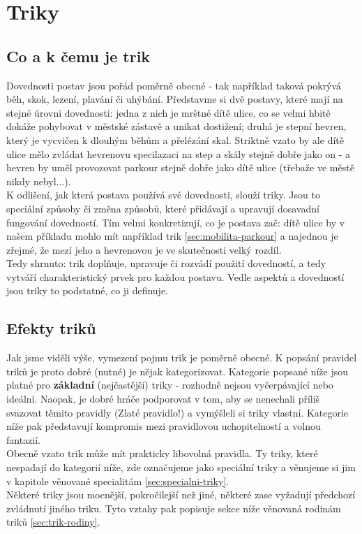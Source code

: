 \documentclass[../main.tex]{subfiles}
\begin{document}
\chapter{Triky}
\label{chap:triky}

\section{Co a k čemu je trik}
\label{sec:coakcemu-trik}
Dovednosti postav jsou pořád poměrně obecné - tak například taková  pokrývá běh, skok, lezení, plavání či uhýbání. Představme si dvě postavy, které mají  na stejné úrovni dovednosti: jedna z nich je mrštné dítě ulice, co se velmi hbitě dokáže pohybovat v městské zástavě a unikat dostižení; druhá je stepní hevren, který je vycvičen k dlouhým běhům a přelézání skal. Striktně vzato by ale dítě ulice mělo zvládat hevrenovu specilazaci na step a skály stejně dobře jako on - a hevren by uměl provozovat parkour stejně dobře jako dítě ulice (třebaže ve městě nikdy nebyl...).\\
K odlišení, jak která postava používá své dovednosti, slouží triky. Jsou to speciální způsoby či změna způsobů, které přidávají a upravují dosavadní fungování dovedností. Tím velmi konkretizují, co je postava zač: dítě ulice by v našem příkladu mohlo mít například trik  \ref{sec:mobilita-parkour} a najednou je zřejmé, že mezí jeho a hevrenovou  je ve skutečnosti velký rozdíl.\\
Tedy shrnuto: trik doplňuje, upravuje či rozvádí použití dovedností, a tedy vytváří charakteristický prvek pro každou postavu. Vedle aspektů a dovedností jsou triky to podstatné, co ji definuje.


\section{Efekty triků}
\label{sec:trik-efekty}
Jak jsme viděli výše, vymezení pojmu trik je poměrně obecné. K popsání pravidel triků je proto dobré (nutné) je nějak kategorizovat. Kategorie popsané níže jsou platné pro \textbf{základní} (nejčastější) triky - rozhodně nejsou vyčerpávající nebo ideální. Naopak, je dobré hráče podporovat v tom, aby se nenechali příliš svazovat těmito pravidly (Zlaté pravidlo!) a vymýšleli si triky vlastní. Kategorie níže pak představují kompromis mezi pravidlovou uchopitelností a volnou fantazií.\\
Obecně vzato trik může mít prakticky libovolná pravidla. Ty triky, které nespadají do kategorií níže, zde označujeme jako speciální triky a věnujeme si jim v kapitole věnované specialitám \ref{sec:specialni-triky}.\\
Některé triky jsou mocnější, pokročilejší než jiné, některé zase vyžadují předchozí zvládnutí jiného triku. Tyto vztahy pak popisuje sekce níže věnovaná rodinám triků \ref{sec:trik-rodiny}. 
\end{document}
